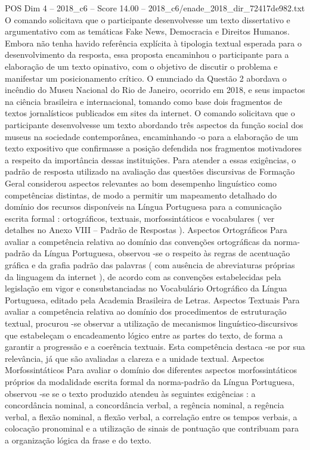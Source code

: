 \begin{textsample}{POS Dim 4 – 2018\_c6 – Score 14.00 – 2018\_c6/enade\_2018\_dir\_72417de982.txt}
O comando solicitava que o participante desenvolvesse um texto dissertativo e argumentativo com as temáticas Fake News, Democracia e Direitos Humanos.
Embora não tenha havido referência explícita à tipologia textual esperada para o desenvolvimento da resposta, essa proposta encaminhou o participante para a elaboração de um texto opinativo, com o objetivo de discutir o problema e manifestar um posicionamento crítico.
O enunciado da Questão 2 abordava o incêndio do Museu Nacional do Rio de Janeiro, ocorrido em 2018, e seus impactos na ciência brasileira e internacional, tomando como base dois fragmentos de textos jornalísticos publicados em sites da internet.
O comando solicitava que o participante desenvolvesse um texto abordando três aspectos da função social dos museus na sociedade contemporânea, encaminhando -o para a elaboração de um texto expositivo que confirmasse a posição defendida nos fragmentos motivadores a respeito da importância dessas instituições.
Para atender a essas exigências, o padrão de resposta utilizado na avaliação das questões discursivas de Formação Geral considerou aspectos relevantes ao bom desempenho linguístico como competências distintas, de modo a permitir um mapeamento detalhado do domínio dos recursos disponíveis na Língua Portuguesa para a comunicação escrita formal : ortográficos, textuais, morfossintáticos e vocabulares ( ver detalhes no Anexo VIII – Padrão de Respostas ).
Aspectos Ortográficos Para avaliar a competência relativa ao domínio das convenções ortográficas da norma-padrão da Língua Portuguesa, observou -se o respeito às regras de acentuação gráfica e da grafia padrão das palavras ( com ausência de abreviaturas próprias da linguagem da internet ), de acordo com as convenções estabelecidas pela legislação em vigor e consubstanciadas no Vocabulário Ortográfico da Língua Portuguesa, editado pela Academia Brasileira de Letras.
Aspectos Textuais Para avaliar a competência relativa ao domínio dos procedimentos de estruturação textual, procurou -se observar a utilização de mecanismos linguístico-discursivos que estabeleçam o encadeamento lógico entre as partes do texto, de forma a garantir a progressão e a coerência textuais.
Esta competência destaca -se por sua relevância, já que são avaliadas a clareza e a unidade textual.
Aspectos Morfossintáticos Para avaliar o domínio dos diferentes aspectos morfossintáticos próprios da modalidade escrita formal da norma-padrão da Língua Portuguesa, observou -se se o texto produzido atendeu às seguintes exigências : a concordância nominal, a concordância verbal, a regência nominal, a regência verbal, a flexão nominal, a flexão verbal, a correlação entre os tempos verbais, a colocação pronominal e a utilização de sinais de pontuação que contribuam para a organização lógica da frase e do texto.

\end{textsample}

